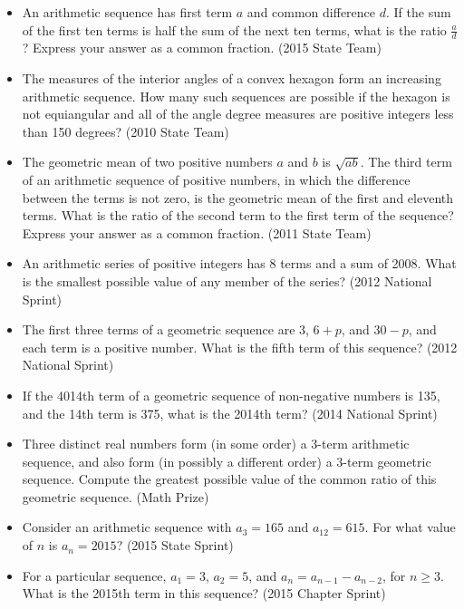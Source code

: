 \documentclass{article}
\begin{document}
\begin{itemize}


\item An arithmetic sequence has first term $a$ and common difference $d$. If the sum of the first ten terms is half the sum of the next ten terms, what is the ratio $\tfrac{a}{d}$? Express your answer as a common fraction. (2015 State Team) 

\item The measures of the interior angles of a convex hexagon form an increasing arithmetic sequence. How many such sequences are possible if the hexagon is not equiangular and all of the angle degree measures are positive integers less than 150 degrees? (2010 State Team)

\item The geometric mean of two positive numbers $a$ and $b$ is $\sqrt{ab}$. The third term of an arithmetic sequence of positive numbers, in which the difference between the terms is not zero, is the geometric mean of the first and eleventh terms. What is the ratio of the second term to the first term of the sequence? Express your answer as a common fraction. (2011 State Team)

\item An arithmetic series of positive integers has 8 terms and a sum of 2008. What is the smallest possible value of any member of the series? (2012 National Sprint)

\item The first three terms of a geometric sequence are $3$, $6+p$, and $30-p$, and each term is a positive number. What is the fifth term of this sequence? (2012 National Sprint)

\item If the 4014th term of a geometric sequence of non-negative numbers is 135, and the 14th term is 375, what is the 2014th term? (2014 National Sprint)

\item Three distinct real numbers form (in some order) a 3-term arithmetic sequence, and also form (in possibly a different order) a 3-term geometric sequence. Compute the greatest possible value of the common ratio of this geometric sequence. (Math Prize)

\item Consider an arithmetic sequence with $a_3=165$ and $a_{12}=615$. For what value of $n$ is $a_n=2015$? (2015 State Sprint)

\item For a particular sequence, $a_1=3$, $a_2=5$, and $a_n=a_{n-1}-a_{n-2}$, for $n\ge 3$. What is the 2015th term in this sequence? (2015 Chapter Sprint)


\end{itemize}
\end{document}
